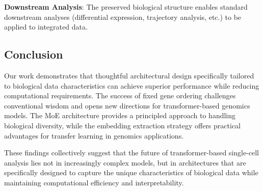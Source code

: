 \textbf{Downstream Analysis}: The preserved biological structure enables standard downstream analyses (differential expression, trajectory analysis, etc.) to be applied to integrated data.

\subsection{Conclusion}

Our work demonstrates that thoughtful architectural design specifically tailored to biological data characteristics can achieve superior performance while reducing computational requirements. The success of fixed gene ordering challenges conventional wisdom and opens new directions for transformer-based genomics models. The MoE architecture provides a principled approach to handling biological diversity, while the embedding extraction strategy offers practical advantages for transfer learning in genomics applications.

These findings collectively suggest that the future of transformer-based single-cell analysis lies not in increasingly complex models, but in architectures that are specifically designed to capture the unique characteristics of biological data while maintaining computational efficiency and interpretability.
